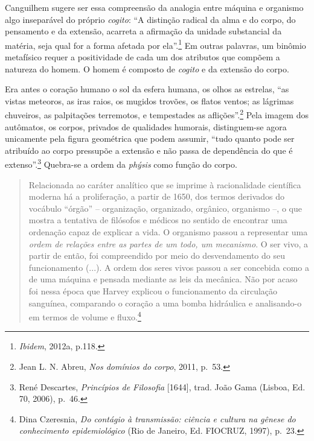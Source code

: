 Canguilhem sugere ser essa compreensão da analogia entre máquina e
organismo algo inseparável do próprio \emph{cogito}: ``A distinção
radical da alma e do corpo, do pensamento e da extensão, acarreta a
afirmação da unidade substancial da matéria, seja qual for a forma
afetada por ela''.\footnote{\emph{Ibidem}, 2012a, p.118.} Em outras
palavras, um binômio metafísico requer a positividade de cada um dos
atributos que compõem a natureza do homem. O homem é composto de
\emph{cogito} e da extensão do corpo.

Era antes o coração humano o sol da esfera humana, os olhos as estrelas,
``as vistas meteoros, as iras raios, os mugidos trovões, os flatos
ventos; as lágrimas chuveiros, as palpitações terremotos, e tempestades
as aflições''.\footnote{Jean L. N. Abreu, \emph{Nos domínios do corpo},
  2011, p.~53.} Pela imagem dos autômatos, os corpos, privados de
qualidades humorais, distinguem-se agora unicamente pela figura
geométrica que podem assumir, ``tudo quanto pode ser atribuído ao corpo
pressupõe a extensão e não passa de dependência do que é
extenso''.\footnote{René Descartes, \emph{Princípios de Filosofia}
  {[}1644{]}, trad. João Gama (Lisboa, Ed. 70, 2006), p.~46.} Quebra-se
a ordem da \emph{phýsis} como função do corpo.

\begin{quote}
Relacionada ao caráter analítico que se imprime à racionalidade
científica moderna há a proliferação, a partir de 1650, dos termos
derivados do vocábulo ``órgão'' -- organização, organizado, orgânico,
organismo --, o que mostra a tentativa de filósofos e médicos no sentido
de encontrar uma ordenação capaz de explicar a vida. O organismo passou
a representar uma \emph{ordem de relações entre as partes de um todo, um
mecanismo}. O ser vivo, a partir de então, foi compreendido por meio do
desvendamento do seu funcionamento (...). A ordem dos seres vivos passou
a ser concebida como a de uma máquina e pensada mediante as leis da
mecânica. Não por acaso foi nessa época que Harvey explicou o
funcionamento da circulação sanguínea, comparando o coração a uma bomba
hidráulica e analisando-o em termos de volume e fluxo.\footnote{Dina
  Czeresnia, \emph{Do contágio à transmissão: ciência e cultura na
  gênese do conhecimento epidemiológico} (Rio de Janeiro, Ed. FIOCRUZ,
  1997), p.~23.}
\end{quote}

